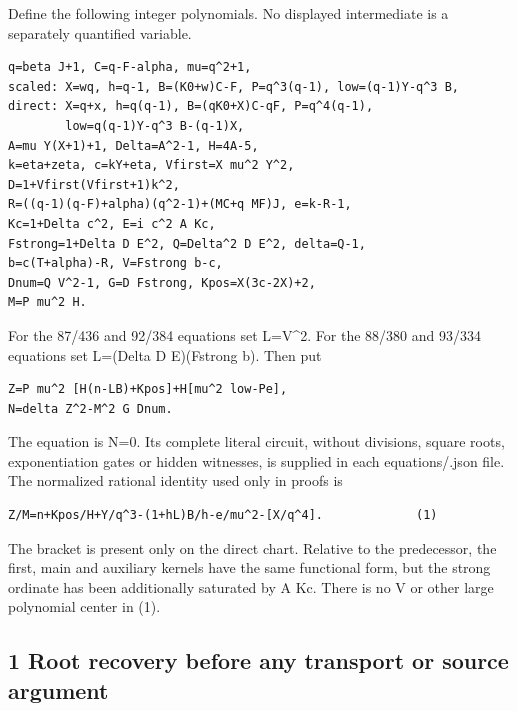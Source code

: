 Define the following integer polynomials. No displayed intermediate is a separately quantified variable.



\begin{verbatim}
q=beta J+1, C=q-F-alpha, mu=q^2+1,
scaled: X=wq, h=q-1, B=(K0+w)C-F, P=q^3(q-1), low=(q-1)Y-q^3 B,
direct: X=q+x, h=q(q-1), B=(qK0+X)C-qF, P=q^4(q-1),
        low=q(q-1)Y-q^3 B-(q-1)X,
A=mu Y(X+1)+1, Delta=A^2-1, H=4A-5,
k=eta+zeta, c=kY+eta, Vfirst=X mu^2 Y^2,
D=1+Vfirst(Vfirst+1)k^2,
R=((q-1)(q-F)+alpha)(q^2-1)+(MC+q MF)J, e=k-R-1,
Kc=1+Delta c^2, E=i c^2 A Kc,
Fstrong=1+Delta D E^2, Q=Delta^2 D E^2, delta=Q-1,
b=c(T+alpha)-R, V=Fstrong b-c,
Dnum=Q V^2-1, G=D Fstrong, Kpos=X(3c-2X)+2,
M=P mu^2 H.
\end{verbatim}

For the 87/\allowbreak{}436 and 92/\allowbreak{}384 equations set L=\allowbreak{}V\textasciicircum{}\allowbreak{}2. For the 88/\allowbreak{}380 and 93/\allowbreak{}334 equations set L=\allowbreak{}(Delta D E)(Fstrong b). Then put



\begin{verbatim}
Z=P mu^2 [H(n-LB)+Kpos]+H[mu^2 low-Pe],
N=delta Z^2-M^2 G Dnum.
\end{verbatim}

The equation is N=\allowbreak{}0. Its complete literal circuit, without divisions, square roots, exponentiation gates or hidden witnesses, is supplied in each equations/\allowbreak{}\textasteriskcentered{}.json file. The normalized rational identity used only in proofs is



\begin{verbatim}
Z/M=n+Kpos/H+Y/q^3-(1+hL)B/h-e/mu^2-[X/q^4].             (1)
\end{verbatim}

The bracket is present only on the direct chart. Relative to the predecessor, the first, main and auxiliary kernels have the same functional form, but the strong ordinate has been additionally saturated by A Kc. There is no V or other large polynomial center in (1).



\subsection{1 Root recovery before any transport or source argument}



